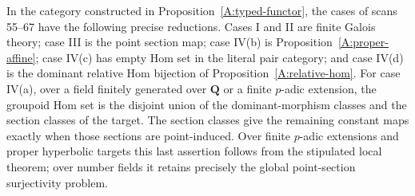 \begin{proposition}
\label{A:section-eight-cases}
In the category constructed in Proposition~\ref{A:typed-functor},
the cases of scans 55--67 have the following precise reductions.
Cases I and II are finite Galois theory; case III is the point
section map; case IV(b) is Proposition~\ref{A:proper-affine};
case IV(c) has empty Hom set in the literal pair category;
and case IV(d) is the dominant relative Hom bijection of
Proposition~\ref{A:relative-hom}. For case IV(a), over a field
finitely generated over $\mathbf Q$ or a finite $p$-adic
extension, the groupoid Hom set is the disjoint union of the
dominant-morphism classes and the section classes of the target.
The section classes give the remaining constant maps exactly
when those sections are point-induced. Over finite $p$-adic
extensions and proper hyperbolic targets this last assertion
follows from the stipulated local theorem; over number fields it
retains precisely the global point-section surjectivity problem.
\end{proposition}
